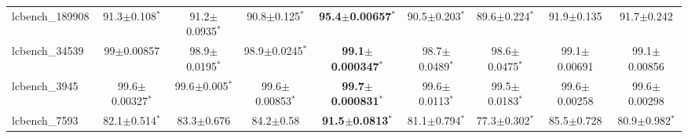 \begin{table}[t]
\begin{center}
\begin{tabular}{lcccccccc}
lcbench\_189908 & 91.3$\pm$0.108$^{*}$ & 91.2$\pm$0.0935$^{*}$ & 90.8$\pm$0.125$^{*}$ & \textbf{95.4$\pm$0.00657}$^{*}$ & 90.5$\pm$0.203$^{*}$ & 89.6$\pm$0.224$^{*}$ & 91.9$\pm$0.135 & 91.7$\pm$0.242 \\
lcbench\_34539 & 99$\pm$0.00857 & 98.9$\pm$0.0195$^{*}$ & 98.9$\pm$0.0245$^{*}$ & \textbf{99.1$\pm$0.000347}$^{*}$ & 98.7$\pm$0.0489$^{*}$ & 98.6$\pm$0.0475$^{*}$ & 99.1$\pm$0.00691 & 99.1$\pm$0.00856 \\
lcbench\_3945 & 99.6$\pm$0.00327$^{*}$ & 99.6$\pm$0.005$^{*}$ & 99.6$\pm$0.00853$^{*}$ & \textbf{99.7$\pm$0.000831}$^{*}$ & 99.6$\pm$0.0113$^{*}$ & 99.5$\pm$0.0183$^{*}$ & 99.6$\pm$0.00258 & 99.6$\pm$0.00298 \\
lcbench\_7593 & 82.1$\pm$0.514$^{*}$ & 83.3$\pm$0.676 & 84.2$\pm$0.58 & \textbf{91.5$\pm$0.0813}$^{*}$ & 81.1$\pm$0.794$^{*}$ & 77.3$\pm$0.302$^{*}$ & 85.5$\pm$0.728 & 80.9$\pm$0.982$^{*}$ \\
\hline
\end{tabular}
\end{center}
\end{table}